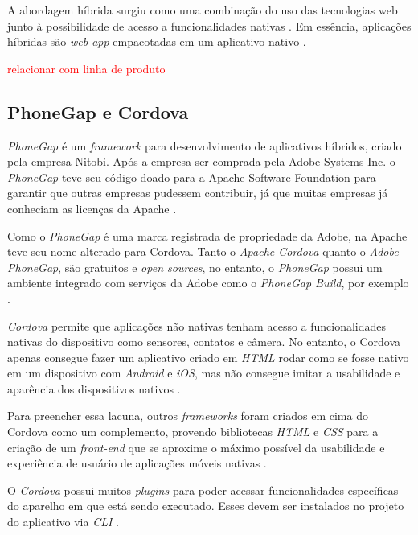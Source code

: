 A abordagem híbrida surgiu como uma combinação do uso das tecnologias web junto à possibilidade de acesso a funcionalidades nativas \cite{heitkotter_evaluating_2013}.
Em essência, aplicações híbridas são \textit{web app} empacotadas em um aplicativo nativo \cite{stark_building_2010}.


\textcolor{red}{relacionar com linha de produto}

\subsection{PhoneGap e Cordova} \label{subsection:phonegap}

\textit{PhoneGap} é um \textit{framework} para desenvolvimento de aplicativos híbridos, criado pela empresa Nitobi. 
Após a empresa ser comprada pela Adobe Systems Inc. o \textit{PhoneGap} teve seu código doado para a Apache Software Foundation 
para garantir que outras empresas pudessem contribuir, já que muitas empresas já conheciam as licenças da Apache \cite{bezerra_desenvolvimento_2016}.


Como o \textit{PhoneGap} é uma marca registrada de propriedade da Adobe, na Apache teve seu nome alterado para Cordova.
Tanto o \textit{Apache Cordova} quanto o \textit{Adobe PhoneGap}, são gratuitos e \textit{open sources}, no entanto, o 
\textit{PhoneGap} possui um ambiente integrado com serviços da Adobe como o \textit{PhoneGap Build}, por exemplo \cite{bezerra_desenvolvimento_2016}.
 
\textit{Cordova} permite que aplicações não nativas tenham acesso a funcionalidades nativas do dispositivo como sensores, 
contatos e câmera. No entanto, o Cordova apenas consegue fazer um aplicativo criado em 
\textit{HTML} rodar como se fosse nativo em um dispositivo com \textit{Android} e \textit{iOS}, mas não consegue 
imitar a usabilidade e aparência dos dispositivos nativos \cite{bezerra_desenvolvimento_2016}. 

Para preencher essa lacuna, outros \textit{frameworks} foram criados em cima do Cordova como um complemento, 
provendo bibliotecas \textit{HTML} e \textit{CSS} para a 
criação de um \textit{front-end} que se aproxime o máximo possível da usabilidade e experiência de usuário de 
aplicações móveis nativas \cite{bezerra_desenvolvimento_2016}.

O \textit{Cordova} possui muitos \textit{plugins} para poder acessar funcionalidades específicas do aparelho em que está sendo 
executado. Esses devem ser instalados no projeto do aplicativo via \textit{CLI} \cite{bezerra_desenvolvimento_2016}. 

